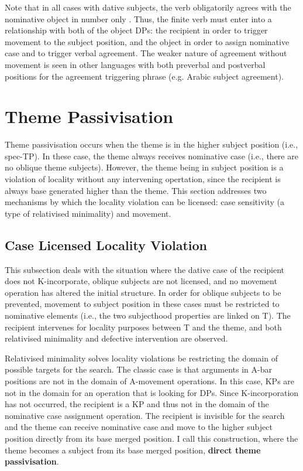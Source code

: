 Note that in all cases with dative subjects, the verb obligatorily agrees with the nominative object in number only \citep{Arnadottir.2013}. Thus, the finite verb must enter into a relationship with both of the object DPs: the recipient in order to trigger movement to the subject position, and the object in order to assign nominative case and to trigger verbal agreement. The weaker nature of agreement without movement is seen in other languages with both preverbal and postverbal positions for the agreement triggering phrase (e.g. Arabic subject agreement).

\section{Theme Passivisation}
Theme passivisation occurs when the theme is in the higher subject position (i.e., spec-TP). In these case, the theme always receives nominative case (i.e., there are no oblique theme subjects). However, the theme being in subject position is a violation of locality without any intervening opertation, since the recipient is always base generated higher than the theme. This section addresses two mechanisms by which the locality violation can be licensed: case sensitivity (a type of relativised minimality) and movement.

\subsection{Case Licensed Locality Violation}
This subsection deals with the situation where the dative case of the recipient does not K-incorporate, oblique subjects are not licensed, and no movement operation has altered the initial structure. In order for oblique subjects to be prevented, movement to subject position in these cases must be restricted to nominative elements (i.e., the two subjecthood properties are linked on T). The recipient intervenes for locality purposes between T and the theme, and both relativised minimality and defective intervention are observed.

Relativised minimality \citep{Rizzi.1990} solves locality violations be restricting the domain of possible targets for the search. The classic case is that arguments in A-bar positions are not in the domain of A-movement operations. In this case, KPs are not in the domain for an operation that is looking for DPs. Since K-incorporation has not occurred, the recipient is a KP and thus not in the domain of the nominative case assignment operation. The recipient is invisible for the search and the theme can receive nominative case and move to the higher subject position directly from its base merged position. I call this construction, where the theme becomes a subject from its base merged position, \textbf{direct theme passivisation}.

